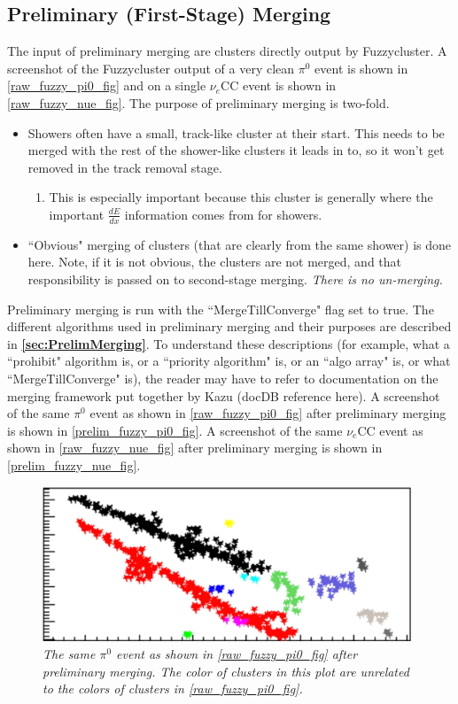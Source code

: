 \documentclass{article}
\begin{document}
\subsection{Preliminary (First-Stage) Merging}
The input of preliminary merging are clusters directly output by Fuzzycluster. A screenshot of the Fuzzycluster output of a very clean $\pi^0$ event is shown in \autoref{raw_fuzzy_pi0_fig} and on a single $\nu_e$CC event is shown in \autoref{raw_fuzzy_nue_fig}. The purpose of preliminary merging is two-fold.
\begin{itemize}
\item Showers often have a small, track-like cluster at their start. This needs to be merged with the rest of the shower-like clusters it leads in to, so it won't get removed in the track removal stage.
	\begin{enumerate}
	\item This is especially important because this cluster is generally where the important $\frac{dE}{dx}$ information comes from for showers.
	\end{enumerate}
\item ``Obvious" merging of clusters (that are clearly from the same shower) is done here. Note, if it is not obvious, the clusters are not merged, and that responsibility is passed on to second-stage merging. \textit{There is no un-merging.}
\end{itemize}
Preliminary merging is run with the ``MergeTillConverge" flag set to true. The different algorithms used in preliminary merging and their purposes are described in \textbf{\autoref{sec:PrelimMerging}}. To understand these descriptions (for example, what a ``prohibit" algorithm is, or a ``priority algorithm" is, or an ``algo array" is, or what ``MergeTillConverge" is), the reader may have to refer to documentation on the merging framework put together by Kazu (docDB reference here). A screenshot of the same $\pi^0$ event as shown in \autoref{raw_fuzzy_pi0_fig} after preliminary merging is shown in \autoref{prelim_fuzzy_pi0_fig}. A screenshot of the same $\nu_e$CC event as shown in \autoref{raw_fuzzy_nue_fig} after preliminary merging is shown in \autoref{prelim_fuzzy_nue_fig}.


\begin{figure}[h!]
\begin{center}
\includegraphics[width=110mm]{Figures/prelim_fuzzy_pi0.png}
\end{center}
\caption{\textit{The same $\pi^0$ event as shown in \autoref{raw_fuzzy_pi0_fig} after preliminary merging. The color of clusters in this plot are unrelated to the colors of clusters in \autoref{raw_fuzzy_pi0_fig}.}}
\label{prelim_fuzzy_pi0_fig}
\end{figure}
\end{document}
